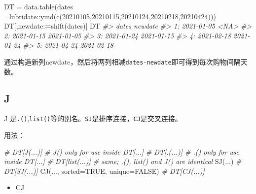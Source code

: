 \documentclass[
]{book}
\newenvironment{Shaded}{\begin{snugshade}}{\end{snugshade}}
\newcommand{\AttributeTok}[1]{\textcolor[rgb]{0.77,0.63,0.00}{#1}}
\newcommand{\CommentTok}[1]{\textcolor[rgb]{0.56,0.35,0.01}{\textit{#1}}}
\newcommand{\ConstantTok}[1]{\textcolor[rgb]{0.00,0.00,0.00}{#1}}
\newcommand{\DecValTok}[1]{\textcolor[rgb]{0.00,0.00,0.81}{#1}}
\newcommand{\ErrorTok}[1]{\textcolor[rgb]{0.64,0.00,0.00}{\textbf{#1}}}
\newcommand{\FunctionTok}[1]{\textcolor[rgb]{0.00,0.00,0.00}{#1}}
\newcommand{\NormalTok}[1]{#1}
\newcommand{\OtherTok}[1]{\textcolor[rgb]{0.56,0.35,0.01}{#1}}
\newcommand{\SpecialCharTok}[1]{\textcolor[rgb]{0.00,0.00,0.00}{#1}}
\providecommand{\tightlist}{%
  \setlength{\itemsep}{0pt}\setlength{\parskip}{0pt}}
\begin{document}
\begin{Shaded}
\begin{Highlighting}[]
\NormalTok{DT }\OtherTok{=} \FunctionTok{data.table}\NormalTok{(}\AttributeTok{dates =}\NormalTok{lubridate}\SpecialCharTok{::}\FunctionTok{ymd}\NormalTok{(}\FunctionTok{c}\NormalTok{(}\DecValTok{20210105}\NormalTok{,}\DecValTok{20210115}\NormalTok{,}\DecValTok{20210124}\NormalTok{,}\DecValTok{20210218}\NormalTok{,}\DecValTok{20210424}\NormalTok{)))}
\NormalTok{DT[,newdate}\SpecialCharTok{:}\ErrorTok{=}\FunctionTok{shift}\NormalTok{(dates)]}
\NormalTok{DT}
\CommentTok{\#\textgreater{}         dates    newdate}
\CommentTok{\#\textgreater{} 1: 2021{-}01{-}05       \textless{}NA\textgreater{}}
\CommentTok{\#\textgreater{} 2: 2021{-}01{-}15 2021{-}01{-}05}
\CommentTok{\#\textgreater{} 3: 2021{-}01{-}24 2021{-}01{-}15}
\CommentTok{\#\textgreater{} 4: 2021{-}02{-}18 2021{-}01{-}24}
\CommentTok{\#\textgreater{} 5: 2021{-}04{-}24 2021{-}02{-}18}
\end{Highlighting}
\end{Shaded}

通过构造新列newdate，然后将两列相减\texttt{dates-newdate}即可得到每次购物间隔天数。

\hypertarget{j}{%
\subsection{J}\label{j}}

J 是\texttt{.()},\texttt{list()}等的别名。\texttt{SJ}是排序连接，\texttt{CJ}是交叉连接。

用法：

\begin{Shaded}
\begin{Highlighting}[]
\CommentTok{\# DT[J(...)]                          \# J() only for use inside DT[...]}
\CommentTok{\# DT[.(...)]                          \# .() only for use inside DT[...]}
\CommentTok{\# DT[list(...)]                       \# same; .(), list() and J() are identical}
\FunctionTok{SJ}\NormalTok{(...)                             }\CommentTok{\# DT[SJ(...)]}
\FunctionTok{CJ}\NormalTok{(..., }\AttributeTok{sorted=}\ConstantTok{TRUE}\NormalTok{, }\AttributeTok{unique=}\ConstantTok{FALSE}\NormalTok{)  }\CommentTok{\# DT[CJ(...)]}
\end{Highlighting}
\end{Shaded}

\begin{itemize}
\tightlist
\item
  CJ
\end{itemize}
\end{document}
